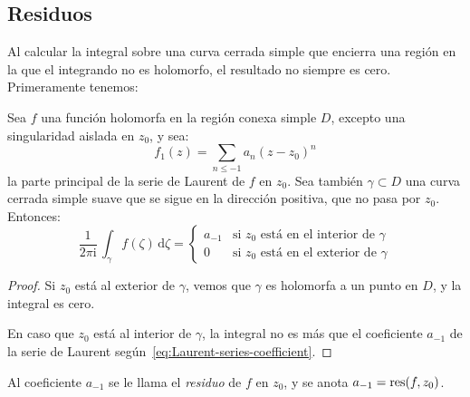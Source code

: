 \subsection{Residuos}
\label{sec:residues}

  Al calcular la integral sobre una curva cerrada simple
  que encierra una región en la que el integrando no es holomorfo,
  el resultado no siempre es cero.
  Primeramente tenemos:
  \begin{lemma}
    \label{lem:integral-residue}
    Sea \(f\) una función holomorfa
    en la región conexa simple \(D\),
    excepto una singularidad aislada en \(z_0\),
    y sea:
    \begin{equation*}
      f_1(z)
	= \sum_{n \le -1} a_n (z - z_0)^n
    \end{equation*}
    la parte principal de la serie de Laurent de \(f\) en \(z_0\).
    Sea también \(\gamma \subset D\) una curva cerrada simple suave
    que se sigue en la dirección positiva,
    que no pasa por \(z_0\).
    Entonces:
    \begin{equation*}
      \frac{1}{2 \pi \mathrm{i}}
	\, \int_\gamma f(\zeta) \, \mathrm{d} \zeta
	= \begin{cases}
	    a_{-1}
	       & \text{si \(z_0\) está en el interior
		       de \(\gamma\)} \\
	    0
	       & \text{si \(z_0\) está en el exterior de \(\gamma\)}
	  \end{cases}
   \end{equation*}
  \end{lemma}
  \begin{proof}
    Si \(z_0\) está al exterior de \(\gamma\),
    vemos que \(\gamma\) es holomorfa a un punto en \(D\),
    y la integral es cero.

    En caso que \(z_0\) está al interior de \(\gamma\),
    la integral no es más que el coeficiente \(a_{-1}\)
    de la serie de Laurent
    según~\eqref{eq:Laurent-series-coefficient}.
  \end{proof}
  Al coeficiente \(a_{-1}\)
  se le llama el \emph{residuo} de \(f\) en \(z_0\),
  y se anota \(a_{-1} = \operatorname{res}(f, z_0)\).

